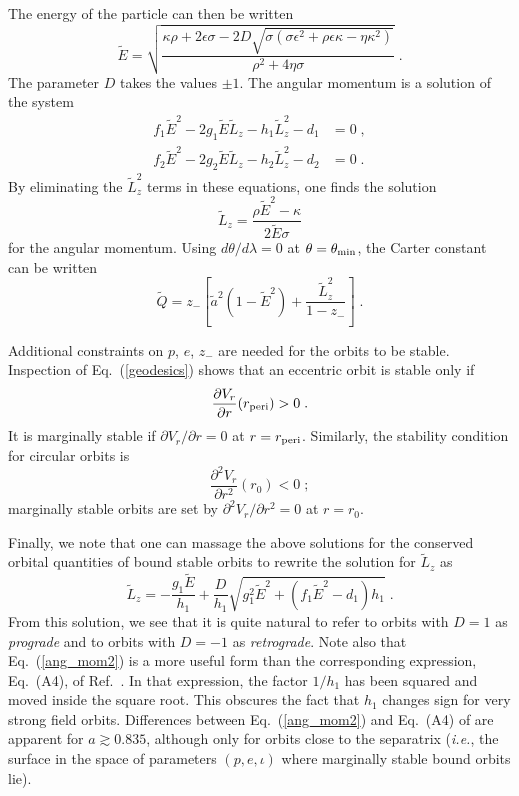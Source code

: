 \documentclass[aps,prd,twocolumn,showpacs,groupedaddress,nofootinbib]{revtex4}
\newcommand{\eq}{\begin{equation}}
\newcommand{\eeq}{\end{equation}}
\begin{document}
The energy of the particle can then be written
\begin{equation}
  \tilde{E} =
  \sqrt{\frac{\kappa\rho+2\epsilon\sigma - 
        2D\sqrt{\sigma(\sigma\epsilon^{2}+\rho\epsilon\kappa-\eta\kappa^{2})}
        }{\rho^{2}+4\eta\sigma}}\;.\label{energy_def}
\end{equation}
The parameter $D$ takes the values $\pm1$.  The angular momentum is
a solution of the system
\begin{eqnarray}
      f_{1}\tilde{E}^{2} - 2 g_{1}\tilde{E}\tilde{L}_{z} - 
      h_{1}\tilde{L}_{z}^{2} - d_{1} & = 0\;,
  \label{eq:Lzsys1}\\
      f_{2}\tilde{E}^{2} - 2 g_{2}\tilde{E}\tilde{L}_{z} - 
      h_{2}\tilde{L}_{z}^{2} - d_{2} & = 0\;.
  \label{eq:Lzsys2}
 \end{eqnarray}
By eliminating the $\tilde{L}_z^2$ terms in these equations, one finds
the solution
\eq\label{L_no_sqrt}
\tilde{L}_z = \frac{\rho\tilde{E}^2-\kappa}{2\tilde{E}\sigma}
\eeq
for the angular momentum.  Using $d\theta/d\lambda = 0$ at $\theta =
\theta_{\rm min}$, the Carter constant can be written
\begin{equation}
  \tilde{Q} = z_{-}\left[\tilde{a}^2(1-\tilde{E}^2) +
  \frac{\tilde{L}_z^2}{1-z_{-}}\right]\;.
\end{equation}


Additional constraints on $p$, $e$, $z_{-}$ are needed for the orbits
to be stable. Inspection of Eq.\ (\ref{geodesics}) shows that an
eccentric orbit is stable only if
\eq \frac{\partial V_r}{\partial
  r}(r_{\rm peri}) >0\;. \eeq 
It is marginally stable if ${\partial V_r}/{\partial r}=0$ at $r =
r_{\rm peri}$. Similarly, the stability condition for circular orbits
is
\eq \frac{\partial^2 V_r}{\partial r^2}(r_0) <0\;;
\eeq
marginally stable orbits are set by ${\partial^2 V_r}/{\partial
r^2}=0$ at $r=r_0$.

Finally, we note that one can massage the above solutions for the
conserved orbital quantities of bound stable orbits to rewrite the
solution for $\tilde{L}_z$ as
\eq
\tilde{L}_z = -\frac{g_1 \tilde{E}}{h_1} + \frac{D}{h_1} \sqrt{g_1^2
\tilde{E}^2 + (f_1 \tilde{E}^2 - d_1)h_1}\;.
\label{ang_mom2}
\eeq
From this solution, we see that it is quite natural to refer to orbits
with $D=1$ as \textit{prograde} and to orbits with $D=-1$ as
\textit{retrograde}. Note also that Eq.\ (\ref{ang_mom2}) is a more
useful form than the corresponding expression, Eq.\ (A4), of Ref.\
\cite{hughes_drasco}.  In that expression, the factor $1/h_1$ has been
squared and moved inside the square root.  This obscures the fact that
$h_1$ changes sign for very strong field orbits.  Differences between
Eq.\ (\ref{ang_mom2}) and Eq.\ (A4) of {\cite{hughes_drasco}} are
apparent for $a\gtrsim0.835$, although only for orbits close to the
separatrix (\textit{i.e.}, the surface in the space of parameters
$(p,e,\iota)$ where marginally stable bound orbits lie).
\end{document}
